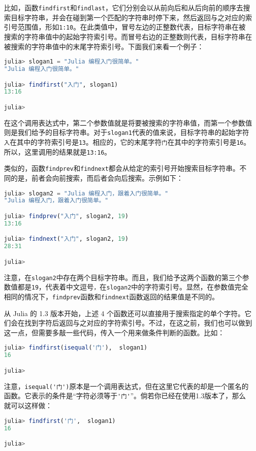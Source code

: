 比如，函数\verb`findfirst`和\verb`findlast`，它们分别会以从前向后和从后向前的顺序去搜索目标字符串，并会在碰到第一个匹配的字符串时停下来，然后返回与之对应的索引号范围值，形如\verb`1:10`。在此类值中，冒号左边的正整数代表，目标字符串在被搜索的字符串值中的起始字符索引号。而冒号右边的正整数则代表，目标字符串在被搜索的字符串值中的末尾字符索引号。下面我们来看一个例子：
\begin{lstlisting}[language=julia]
julia> slogan1 = "Julia 编程入门很简单。"
"Julia 编程入门很简单。"

julia> findfirst("入门", slogan1)
13:16

julia> 
\end{lstlisting}

在这个调用表达式中，第二个参数值就是将要被搜索的字符串值，而第一个参数值则是我们给予的目标字符串。对于\verb`slogan1`代表的值来说，目标字符串的起始字符\verb`入`在其中的字符索引号是\verb`13`。相应的，它的末尾字符\verb`门`在其中的字符索引号是\verb`16`。所以，这里调用的结果就是\verb`13:16`。

类似的，函数\verb`findprev`和\verb`findnext`都会从给定的索引号开始搜索目标字符串。不同的是，前者会向前搜索，而后者会向后搜索。示例如下：
\begin{lstlisting}[language=julia]
julia> slogan2 = "Julia 编程入门，跟着入门很简单。"
"Julia 编程入门，跟着入门很简单。"

julia> findprev("入门", slogan2, 19)
13:16

julia> findnext("入门", slogan2, 19)
28:31

julia> 
\end{lstlisting}

注意，在\verb`slogan2`中存在两个目标字符串。而且，我们给予这两个函数的第三个参数值都是\verb`19`，代表着中文逗号\verb`，`在\verb`slogan2`中的字符索引号。显然，在参数值完全相同的情况下，\verb`findprev`函数和\verb`findnext`函数返回的结果值是不同的。

从 Julia 的 1.3 版本开始，上述 4 个函数还可以直接用于搜索指定的单个字符。它们会在找到字符后返回与之对应的字符索引号。不过，在这之前，我们也可以做到这一点，但需要多敲一些代码，传入一个用来做条件判断的函数。比如：
\begin{lstlisting}[language=julia]
julia> findfirst(isequal('门'),  slogan1) 
16

julia> 
\end{lstlisting}

注意，\verb`isequal('门')`原本是一个调用表达式，但在这里它代表的却是一个匿名的函数。它表示的条件是“字符必须等于\verb`'门'`”。倘若你已经在使用1.3版本了，那么就可以这样做：
\begin{lstlisting}[language=julia]
julia> findfirst('门',  slogan1)
16

julia> 
\end{lstlisting}

